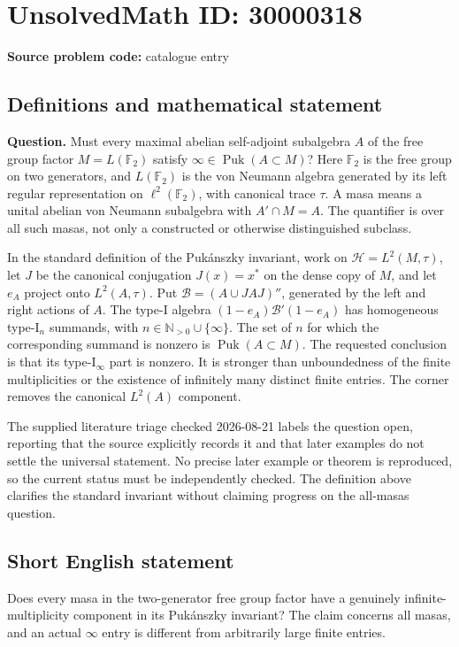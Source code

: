\documentclass[11pt]{article}
\newcommand{\N}{\mathbb{N}}
\newcommand{\F}{\mathbb{F}}
\begin{document}
\section*{UnsolvedMath ID: 30000318}
\textbf{Source problem code:} catalogue entry
\subsection{Definitions and mathematical statement}
\textbf{Question.} Must every maximal abelian self-adjoint subalgebra \(A\) of the free group factor \(M=L(\F_2)\) satisfy \(\infty\in\operatorname{Puk}(A\subset M)\)? Here \(\F_2\) is the free group on two generators, and \(L(\F_2)\) is the von Neumann algebra generated by its left regular representation on \(\ell^2(\F_2)\), with canonical trace \(\tau\). A masa means a unital abelian von Neumann subalgebra with \(A'\cap M=A\). The quantifier is over all such masas, not only a constructed or otherwise distinguished subclass.\par In the standard definition of the Puk\'anszky invariant, work on \(\mathcal H=L^2(M,\tau)\), let \(J\) be the canonical conjugation \(J(x)=x^*\) on the dense copy of \(M\), and let \(e_A\) project onto \(L^2(A,\tau)\). Put \(\mathcal B=(A\cup JAJ)''\), generated by the left and right actions of \(A\). The type-I algebra \((1-e_A)\mathcal B'(1-e_A)\) has homogeneous type-\(\mathrm I_n\) summands, with \(n\in\N_{>0}\cup\{\infty\}\). The set of \(n\) for which the corresponding summand is nonzero is \(\operatorname{Puk}(A\subset M)\). The requested conclusion is that its type-\(\mathrm I_\infty\) part is nonzero. It is stronger than unboundedness of the finite multiplicities or the existence of infinitely many distinct finite entries. The corner removes the canonical \(L^2(A)\) component.\par The supplied literature triage checked 2026-08-21 labels the question open, reporting that the source explicitly records it and that later examples do not settle the universal statement. No precise later example or theorem is reproduced, so the current status must be independently checked. The definition above clarifies the standard invariant without claiming progress on the all-masas question.
\subsection{Short English statement}
Does every masa in the two-generator free group factor have a genuinely infinite-multiplicity component in its Puk\'anszky invariant? The claim concerns all masas, and an actual \(\infty\) entry is different from arbitrarily large finite entries.
\end{document}
